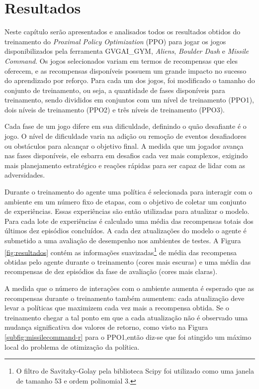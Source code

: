 \chapter{Resultados}
\label{cap:resultados}

Neste capítulo serão apresentados e analisados todos os resultados obtidos do treinamento do \textit{Proximal Policy Optimization} (PPO) para jogar os jogos disponibilizados pela ferramenta GVGAI\_GYM, \textit{Aliens}, \textit{Boulder Dash} e \textit{Missile Command}. Os jogos selecionados variam em termos de recompensas que eles oferecem, e as recompensas disponíveis possuem um grande impacto no sucesso do aprendizado por reforço. Para cada um dos jogos, foi modificado o tamanho do conjunto de treinamento, ou seja, a quantidade de fases disponíveis para treinamento, sendo divididos em conjuntos com um nível de treinamento (PPO1), dois níveis de treinamento (PPO2) e três níveis de treinamento (PPO3). 

Cada fase de um jogo difere em sua dificuldade, definindo o quão desafiante é o jogo. O nível de dificuldade varia na adição ou remoção de eventos desafiadores ou obstáculos para alcançar o objetivo final. A medida que um jogador avança nas fases disponíveis, ele esbarra em desafios cada vez mais complexos, exigindo mais planejamento estratégico e reações rápidas para ser capaz de lidar com as adversidades.

Durante o treinamento do agente uma política é selecionada para interagir com o ambiente em um número fixo de etapas, com o objetivo de coletar um conjunto de experiências. Essas experiências são então utilizadas para atualizar o modelo. Para cada lote de experiências é calculado uma média das recompensas totais dos últimos dez episódios concluídos. A cada dez atualizações do modelo o agente é submetido a uma avaliação de desempenho nos ambientes de testes. A Figura \ref{fig:resultados} contém as informações suavizadas\footnote{O filtro de Savitzky-Golay pela biblioteca Scipy foi utilizado como uma janela de tamanho 53 e ordem polinomial 3.} de média das recompensa obtidas pelo agente durante o treinamento (cores mais escuras) e uma média das recompensas de dez episódios da fase de avaliação (cores mais claras). 

A medida que o número de interações com o ambiente aumenta é esperado que as recompensas durante o treinamento também aumentem: cada atualização deve levar a políticas que maximizem cada vez mais a recompensa obtida. Se o treinamento chegar a tal ponto em que a cada atualização não é observado uma mudança significativa dos valores de retorno, como visto na Figura \ref{subfig:missilecommand-r} para o PPO1,então diz-se que foi atingido um máximo local do problema de otimização da política. 

